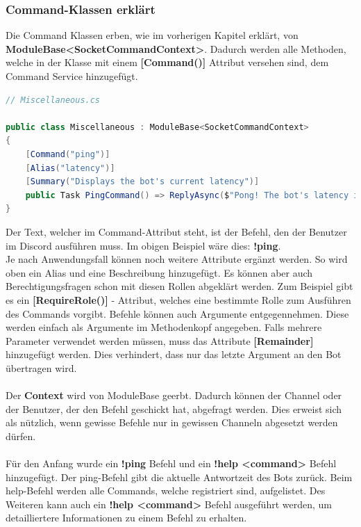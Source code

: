 \documentclass[a4paper, table]{article}
\begin{document}
\subsubsection*{Command-Klassen erklärt}
Die Command Klassen erben, wie im vorherigen Kapitel erklärt, von \textbf{ModuleBase<SocketCommandContext>}.
Dadurch werden alle Methoden, welche in der Klasse mit einem \textbf{[Command()]} Attribut versehen sind,
dem Command Service hinzugefügt.

\begin{lstlisting}[language=csharp]
// Miscellaneous.cs

public class Miscellaneous : ModuleBase<SocketCommandContext>
{
    [Command("ping")]
    [Alias("latency")]
    [Summary("Displays the bot's current latency")]
    public Task PingCommand() => ReplyAsync($"Pong! The bot's latency is {Context.Client.Latency} ms.");
}
\end{lstlisting}

Der Text, welcher im Command-Attribut steht, ist der Befehl, den der Benutzer im Discord ausführen muss.
Im obigen Beispiel wäre dies: \textbf{!ping}.\\
Je nach Anwendungsfall können noch weitere Attribute ergänzt werden.
So wird oben ein Alias und eine Beschreibung hinzugefügt.
Es können aber auch Berechtigungsfragen schon mit diesen Rollen abgeklärt werden.
Zum Beispiel gibt es ein \textbf{[RequireRole()]} - Attribut, welches eine bestimmte Rolle zum Ausführen des Commands vorgibt.
Befehle können auch Argumente entgegennehmen.
Diese werden einfach als Argumente im Methodenkopf angegeben.
Falls mehrere Parameter verwendet werden müssen, muss das Attribute \textbf{[Remainder]} hinzugefügt werden.
Dies verhindert, dass nur das letzte Argument an den Bot übertragen wird.\\\\
Der \textbf{Context} wird von ModuleBase geerbt.
Dadurch können der Channel oder der Benutzer, der den Befehl geschickt hat, abgefragt werden.
Dies erweist sich als nützlich, wenn gewisse Befehle nur in gewissen Channeln abgesetzt werden dürfen.\\\\
Für den Anfang wurde ein \textbf{!ping} Befehl und ein \textbf{!help <command>} Befehl hinzugefügt.
Der ping-Befehl gibt die aktuelle Antwortzeit des Bots zurück.
Beim help-Befehl werden alle Commands, welche registriert sind, aufgelistet.
Des Weiteren kann auch ein \textbf{!help <command>} Befehl ausgeführt werden, um detailliertere Informationen zu einem Befehl zu erhalten.
\end{document}

